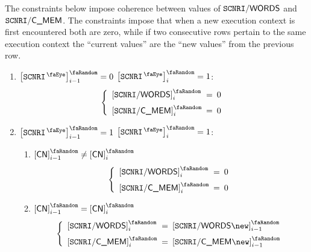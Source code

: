 The constraints below impose coherence between values of
$\texttt{SCNRI}\textsf{/}{\textsf{\textsf{WORDS}}}$ and
$\texttt{SCNRI}\textsf{/}{\textsf{\textsf{C\_MEM}}} $.
The constraints impose that when a new execution context is first encountered both are zero,
while if two consecutive rows pertain to the same execution context the ``current values'' are the ``new values'' from the previous row.
\begin{enumerate}
	\item
		\If $\order{\isMxpScenario} _{i - 1} = 0$
		\et $\order{\isMxpScenario} _{i}     = 1$:
		\Then
		\[
			\left\{ \begin{array}{lcl}
				\order{\mxpScenarioWords} _{i} & \!\!\! = \!\!\! & 0 \vspace{2mm} \\
				\order{\mxpScenarioCmem}  _{i} & \!\!\! = \!\!\! & 0              \\
			\end{array} \right.
		\]
	\item
		\If $\order{\isMxpScenario} _{i - 1} = 1$
		\et $\order{\isMxpScenario} _{i}     = 1$:
		\Then
		\begin{enumerate}
			\item \If $\order{\cn}_{i - 1} \neq \order{\cn}_{i}$ \Then
				\[
					\left\{ \begin{array}{lcl}
						\order{\mxpScenarioWords} _{i} & \!\!\! = \!\!\! & 0 \vspace{2mm} \\
						\order{\mxpScenarioCmem}  _{i} & \!\!\! = \!\!\! & 0 \\
					\end{array} \right.
				\]
			\item \If $\order{\cn}_{i - 1} = \order{\cn}_{i}$ \Then
				\[
					\left\{ \begin{array}{lcl}
						\order{\mxpScenarioWords} _{i} & \!\!\! = \!\!\! & \order{\mxpScenarioWords\new} _{i - 1} \vspace{2mm} \\
						\order{\mxpScenarioCmem}  _{i} & \!\!\! = \!\!\! & \order{\mxpScenarioCmem\new } _{i - 1} \\
					\end{array} \right.
				\]
		\end{enumerate}
\end{enumerate}
